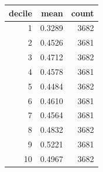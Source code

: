 \begin{tabular}{rrr}
\toprule
decile & mean & count \\
\midrule
1 & 0.3289 & 3682 \\
2 & 0.4526 & 3681 \\
3 & 0.4712 & 3682 \\
4 & 0.4578 & 3681 \\
5 & 0.4484 & 3682 \\
6 & 0.4610 & 3681 \\
7 & 0.4564 & 3681 \\
8 & 0.4832 & 3682 \\
9 & 0.5221 & 3681 \\
10 & 0.4967 & 3682 \\
\bottomrule
\end{tabular}
